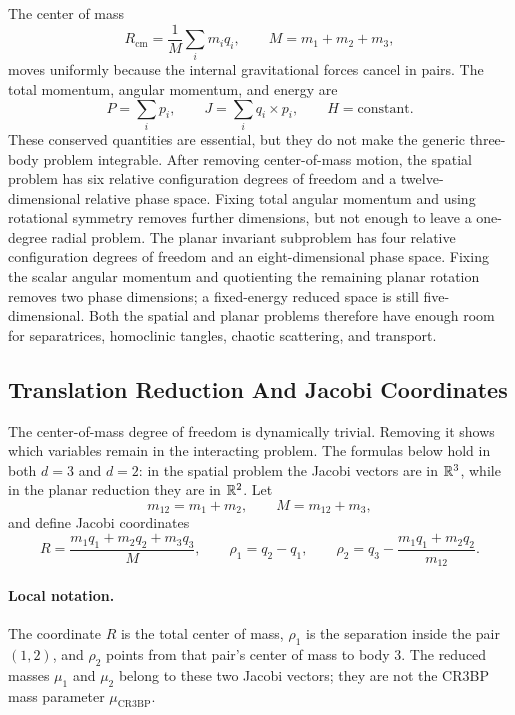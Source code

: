 The center of mass
\[
  R_{\mathrm{cm}}=\frac{1}{M}\sum_i m_iq_i,
  \qquad
  M=m_1+m_2+m_3,
\]
moves uniformly because the internal gravitational forces cancel in pairs.
The total momentum, angular momentum, and energy are
\[
  P=\sum_i p_i,
  \qquad
  J=\sum_i q_i\times p_i,
  \qquad
  H=\text{constant}.
\]
These conserved quantities are essential, but they do not make the generic
three-body problem integrable. After removing center-of-mass motion, the
spatial problem has six relative configuration degrees of freedom and a
twelve-dimensional relative phase space. Fixing total angular momentum and
using rotational symmetry removes further dimensions, but not enough to leave a
one-degree radial problem. The planar invariant subproblem has four relative
configuration degrees of freedom and an eight-dimensional phase space. Fixing
the scalar angular momentum and quotienting the remaining planar rotation
removes two phase dimensions; a fixed-energy reduced space is still
five-dimensional.  Both the spatial and planar problems therefore have enough
room for separatrices, homoclinic tangles, chaotic scattering, and transport.

\subsection{Translation Reduction And Jacobi Coordinates}
\label{subsec:three-body-jacobi-coordinates}

The center-of-mass degree of freedom is dynamically trivial. Removing it shows
which variables remain in the interacting problem. The formulas below hold in
both \(d=3\) and \(d=2\): in the spatial problem the Jacobi vectors are in
\(\mathbb{R}^3\), while in the planar reduction they are in \(\mathbb{R}^2\). Let
\[
  m_{12}=m_1+m_2,\qquad M=m_{12}+m_3,
\]
and define Jacobi coordinates
\[
  R=\frac{m_1q_1+m_2q_2+m_3q_3}{M},
  \qquad
  \rho_1=q_2-q_1,
  \qquad
  \rho_2=q_3-\frac{m_1q_1+m_2q_2}{m_{12}}.
\]

\paragraph{Local notation.}
The coordinate \(R\) is the total center of mass, \(\rho_1\) is the separation
inside the pair \((1,2)\), and \(\rho_2\) points from that pair's center of
mass to body \(3\).  The reduced masses \(\mu_1\) and \(\mu_2\) belong to
these two Jacobi vectors; they are not the CR3BP mass parameter
\(\mu_{\mathrm{CR3BP}}\).

